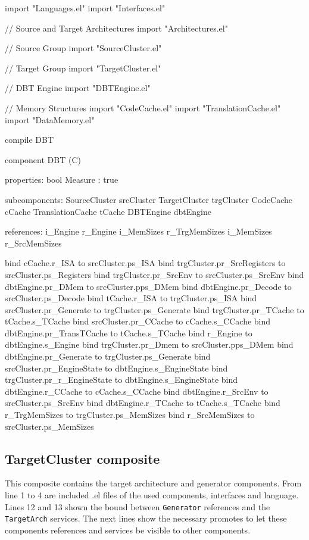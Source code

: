 \documentclass[11pt]{report}
\begin{document}
	\begin{EL}
	import "Languages.el"
	import "Interfaces.el"
	
	// Source and Target Architectures
	import "Architectures.el"
	
	// Source Group
	import "SourceCluster.el"
	
	// Target Group 
	import "TargetCluster.el"
	
	// DBT Engine
	import "DBTEngine.el"
	
	// Memory Structures 
	import "CodeCache.el"
	import "TranslationCache.el"
	import "DataMemory.el"
	
	compile DBT
	
	component DBT (C)
	{
		properties:
			bool Measure : true
		
		subcomponents:
			SourceCluster srcCluster
			TargetCluster trgCluster
			CodeCache cCache
			TranslationCache tCache	
			DBTEngine dbtEngine
		
		references:
			i_Engine r_Engine
			i_MemSizes r_TrgMemSizes
			i_MemSizes r_SrcMemSizes
		
		bind cCache.r_ISA to srcCluster.ps_ISA
		bind trgCluster.pr_SrcRegisters to srcCluster.ps_Registers
		bind trgCluster.pr_SrcEnv to srcCluster.ps_SrcEnv
		bind dbtEngine.pr_DMem to srcCluster.pps_DMem
		bind dbtEngine.pr_Decode to srcCluster.ps_Decode
		bind tCache.r_ISA to trgCluster.ps_ISA
		bind srcCluster.pr_Generate to trgCluster.ps_Generate
		bind trgCluster.pr_TCache to tCache.s_TCache
		bind srcCluster.pr_CCache to cCache.s_CCache
		bind dbtEngine.pr_TransTCache to tCache.s_TCache
		bind r_Engine to dbtEngine.s_Engine
		bind trgCluster.pr_Dmem to srcCluster.pps_DMem					
		bind dbtEngine.pr_Generate to trgCluster.ps_Generate    	
		bind srcCluster.pr_EngineState to dbtEngine.s_EngineState 		
		bind trgCluster.pr_r_EngineState to dbtEngine.s_EngineState 	
		bind dbtEngine.r_CCache to cCache.s_CCache						
		bind dbtEngine.r_SrcEnv to srcCluster.ps_SrcEnv					
		bind dbtEngine.r_TCache to tCache.s_TCache
		bind r_TrgMemSizes to trgCluster.ps_MemSizes
		bind r_SrcMemSizes to srcCluster.ps_MemSizes
	}	
	\end{EL}
	
	\subsection*{TargetCluster composite}
	
	\par This composite contains the target architecture and generator components. From line 1 to 4 are included .el files of the used components, interfaces and language. Lines 12 and 13 shown the bound between \texttt{Generator} references and the \texttt{TargetArch} services. The next lines show the necessary promotes to let these components references and services be visible to other components.
		
\end{document}
